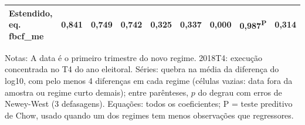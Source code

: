 \begin{table}[htbp]
\begin{tabular}{lcccccccc}
Estendido, eq. fbcf\_me & 0{,}841 & 0{,}749 & 0{,}742 & 0{,}325 & 0{,}337 & 0{,}000 & 0{,}987\textsuperscript{P} & 0{,}314 \\
\bottomrule
\end{tabular}
\begin{minipage}{0.97\linewidth}\footnotesize
\medskip Notas: A data \'e o primeiro trimestre do novo regime. 2018T4: execu\c{c}\~ao concentrada no T4 do ano eleitoral. S\'eries: quebra na m\'edia da diferen\c{c}a do log10, com pelo menos 4 diferen\c{c}as em cada regime (c\'elulas vazias: data fora da amostra ou regime curto demais); entre par\^enteses, $p$ do degrau com erros de Newey-West (3 defasagens). Equa\c{c}\~oes: todos os coeficientes; P = teste preditivo de Chow, usado quando um dos regimes tem menos observa\c{c}\~oes que regressores.
\end{minipage}
\end{table}

